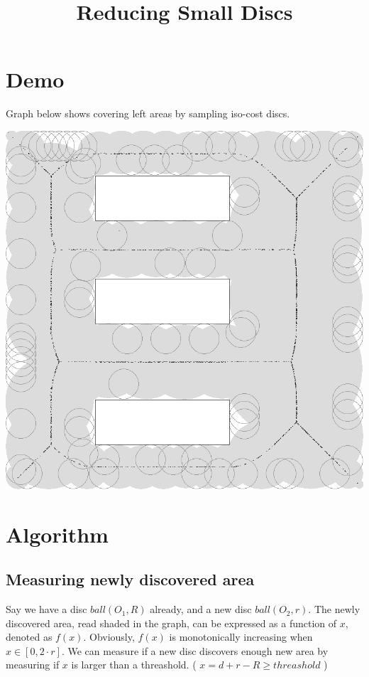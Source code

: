 \documentclass[12pt]{article}
\title{Reducing Small Discs}
\date{}
\begin{document}
  \maketitle
  
  \section{Demo}
  Graph below shows covering left areas by sampling iso-cost discs. 
  
  \includegraphics[scale=0.5]{MedialAxis_bnd_iso_better.PNG}  
  
  \section{Algorithm}

	\subsection{Measuring newly discovered area}
    Say we have a disc $ball(O_1, R)$ already, and a new disc $ball(O_2, r)$. The newly discovered area, read shaded in the graph, can be expressed as a function of $x$, denoted as $f(x)$. Obviously, $f(x)$ is monotonically increasing when $x \in [0, 2\cdot r]$. We can measure if a new disc discovers enough new area by measuring if $x$ is larger than a threashold. ( $x = d+r-R \geq threashold$ )
    
\end{document}
